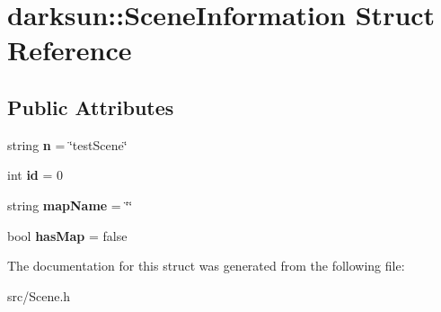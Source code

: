 \hypertarget{structdarksun_1_1_scene_information}{}\section{darksun\+::Scene\+Information Struct Reference}
\label{structdarksun_1_1_scene_information}
\subsection*{Public Attributes}
\begin{DoxyCompactItemize}
\item 
\mbox{\label{structdarksun_1_1_scene_information_a2ddd1c63a06f7f0f3327237cb9bd7382}} 
string {\bfseries n} = \char`\"{}test\+Scene\char`\"{}
\item 
\mbox{\label{structdarksun_1_1_scene_information_aebcd13644afdc9f872898740fde14142}} 
int {\bfseries id} = 0
\item 
\mbox{\label{structdarksun_1_1_scene_information_a1211424ee18883a1292755635d77b8ba}} 
string {\bfseries map\+Name} = \char`\"{}\char`\"{}
\item 
\mbox{\label{structdarksun_1_1_scene_information_ada1159351f95dd0c2ccd7f1d5c7c81be}} 
bool {\bfseries has\+Map} = false
\end{DoxyCompactItemize}


The documentation for this struct was generated from the following file\+:\begin{DoxyCompactItemize}
\item 
src/Scene.\+h\end{DoxyCompactItemize}
